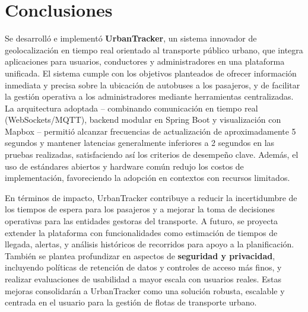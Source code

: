 \section{Conclusiones}
Se desarrolló e implementó \textbf{UrbanTracker}, un sistema innovador de geolocalización en tiempo real orientado al transporte público urbano, que integra aplicaciones para usuarios, conductores y administradores en una plataforma unificada. El sistema cumple con los objetivos planteados de ofrecer información inmediata y precisa sobre la ubicación de autobuses a los pasajeros, y de facilitar la gestión operativa a los administradores mediante herramientas centralizadas. La arquitectura adoptada -- combinando comunicación en tiempo real (WebSockets/MQTT), backend modular en Spring Boot y visualización con Mapbox -- permitió alcanzar frecuencias de actualización de aproximadamente 5 segundos y mantener latencias generalmente inferiores a 2 segundos en las pruebas realizadas, satisfaciendo así los criterios de desempeño clave. Además, el uso de estándares abiertos y hardware común redujo los costos de implementación, favoreciendo la adopción en contextos con recursos limitados.

En términos de impacto, UrbanTracker contribuye a reducir la incertidumbre de los tiempos de espera para los pasajeros y a mejorar la toma de decisiones operativas para las entidades gestoras del transporte. A futuro, se proyecta extender la plataforma con funcionalidades como estimación de tiempos de llegada, alertas, y análisis históricos de recorridos para apoyo a la planificación. También se plantea profundizar en aspectos de \textbf{seguridad y privacidad}, incluyendo políticas de retención de datos y controles de acceso más finos, y realizar evaluaciones de usabilidad a mayor escala con usuarios reales. Estas mejoras consolidarán a UrbanTracker como una solución robusta, escalable y centrada en el usuario para la gestión de flotas de transporte urbano.
